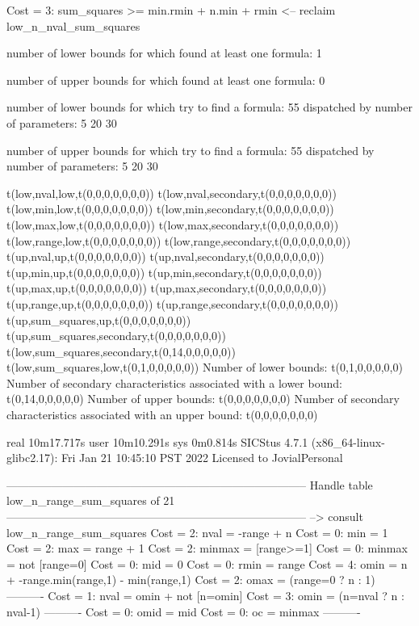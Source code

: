 Cost =  3:  sum_squares >= min.rmin + n.min + rmin
<-- reclaim low_n_nval_sum_squares

number of lower bounds for which found at least one formula: 1

number of upper bounds for which found at least one formula: 0

number of lower bounds for which try to find a formula: 55
dispatched by number of parameters: 5  20  30

number of upper bounds for which try to find a formula: 55
dispatched by number of parameters: 5  20  30

t(low,nval,low,t(0,0,0,0,0,0,0))
t(low,nval,secondary,t(0,0,0,0,0,0,0))
t(low,min,low,t(0,0,0,0,0,0,0))
t(low,min,secondary,t(0,0,0,0,0,0,0))
t(low,max,low,t(0,0,0,0,0,0,0))
t(low,max,secondary,t(0,0,0,0,0,0,0))
t(low,range,low,t(0,0,0,0,0,0,0))
t(low,range,secondary,t(0,0,0,0,0,0,0))
t(up,nval,up,t(0,0,0,0,0,0,0))
t(up,nval,secondary,t(0,0,0,0,0,0,0))
t(up,min,up,t(0,0,0,0,0,0,0))
t(up,min,secondary,t(0,0,0,0,0,0,0))
t(up,max,up,t(0,0,0,0,0,0,0))
t(up,max,secondary,t(0,0,0,0,0,0,0))
t(up,range,up,t(0,0,0,0,0,0,0))
t(up,range,secondary,t(0,0,0,0,0,0,0))
t(up,sum_squares,up,t(0,0,0,0,0,0,0))
t(up,sum_squares,secondary,t(0,0,0,0,0,0,0))
t(low,sum_squares,secondary,t(0,14,0,0,0,0,0))
t(low,sum_squares,low,t(0,1,0,0,0,0,0))
Number of lower bounds:                                             t(0,1,0,0,0,0,0)
Number of secondary characteristics associated with a lower bound:  t(0,14,0,0,0,0,0)
Number of upper bounds:                                             t(0,0,0,0,0,0,0)
Number of secondary characteristics associated with an upper bound: t(0,0,0,0,0,0,0)

real	10m17.717s
user	10m10.291s
sys	0m0.814s
SICStus 4.7.1 (x86_64-linux-glibc2.17): Fri Jan 21 10:45:10 PST 2022
Licensed to JovialPersonal


--------------------------------------------------------------------------------
Handle table low_n_range_sum_squares of 21
--------------------------------------------------------------------------------
--> consult low_n_range_sum_squares
Cost =  2:  nval   = -range + n
Cost =  0:  min    = 1
Cost =  2:  max    = range + 1
Cost =  2:  minmax = [range>=1]
Cost =  0:  minmax = not [range=0]
Cost =  0:  mid    = 0
Cost =  0:  rmin   = range
Cost =  4:  omin   = n + -range.min(range,1) - min(range,1) %
Cost =  2:  omax   = (range=0 ? n : 1)
----------
Cost =  1:  nval   = omin + not [n=omin] %
Cost =  3:  omin   = (n=nval ? n : nval-1)
----------
Cost =  0:  omid   = mid
Cost =  0:  oc     = minmax
----------

